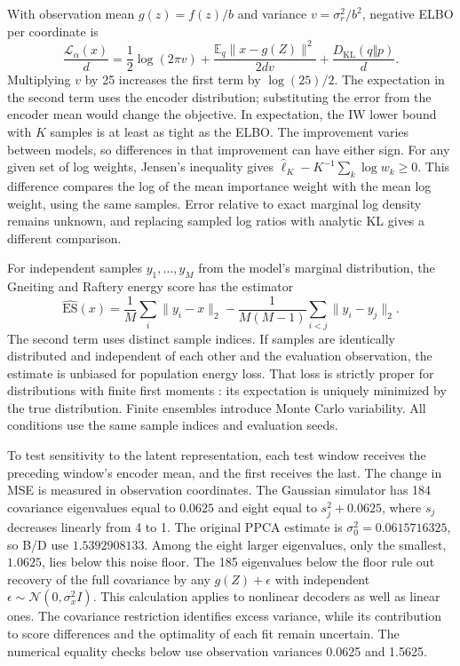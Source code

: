 \documentclass{article}
\newcommand{\E}{\mathbb{E}}
\newcommand{\KL}{D_{\mathrm{KL}}}
\begin{document}
With observation mean $g(z)=f(z)/b$ and variance $v=\sigma_r^2/b^2$, negative ELBO per coordinate is
\begin{equation}
\frac{\mathcal L_\alpha(x)}{d}=\frac12\log(2\pi v)+\frac{\E_q\|x-g(Z)\|^2}{2dv}+\frac{\KL(q\Vert p)}d.
\label{eq:elbo_components}
\end{equation}
Multiplying $v$ by 25 increases the first term by $\log(25)/2$. The expectation in the second term uses the encoder distribution; substituting the error from the encoder mean would change the objective. In expectation, the IW lower bound with $K$ samples is at least as tight as the ELBO. The improvement varies between models, so differences in that improvement can have either sign. For any given set of log weights, Jensen's inequality gives $\widehat\ell_K-K^{-1}\sum_k\log w_k\geq0$. This difference compares the log of the mean importance weight with the mean log weight, using the same samples. Error relative to exact marginal log density remains unknown, and replacing sampled log ratios with analytic KL gives a different comparison.

For independent samples $y_1,\ldots,y_M$ from the model's marginal distribution, the Gneiting and Raftery energy score has the estimator
\begin{equation}
\widehat{\mathrm{ES}}(x)=\frac1M\sum_i\|y_i-x\|_2
-\frac{1}{M(M-1)}\sum_{i<j}\|y_i-y_j\|_2.
\end{equation}
The second term uses distinct sample indices. If samples are identically distributed and independent of each other and the evaluation observation, the estimate is unbiased for population energy loss. That loss is strictly proper for distributions with finite first moments \citep{GneitingRaftery2007ProperScoringRules}: its expectation is uniquely minimized by the true distribution. Finite ensembles introduce Monte Carlo variability. All conditions use the same sample indices and evaluation seeds.

To test sensitivity to the latent representation, each test window receives the preceding window's encoder mean, and the first receives the last. The change in MSE is measured in observation coordinates.
The Gaussian simulator has 184 covariance eigenvalues equal to $0.0625$ and eight equal to $s_j^2+0.0625$, where $s_j$ decreases linearly from 4 to 1. The original PPCA estimate is $\sigma_0^2=0.0615716325$, so B/D use $1.5392908133$. Among the eight larger eigenvalues, only the smallest, $1.0625$, lies below this noise floor. The 185 eigenvalues below the floor rule out recovery of the full covariance by any $g(Z)+\epsilon$ with independent $\epsilon\sim\mathcal N(0,\sigma_x^2I)$. This calculation applies to nonlinear decoders as well as linear ones. The covariance restriction identifies excess variance, while its contribution to score differences and the optimality of each fit remain uncertain. The numerical equality checks below use observation variances 0.0625 and 1.5625.
\end{document}
